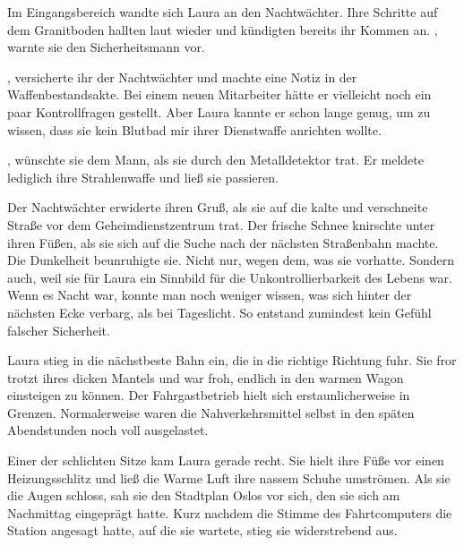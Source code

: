 Im Eingangsbereich wandte sich Laura an den Nachtwächter. Ihre Schritte auf dem Granitboden hallten laut wieder und kündigten bereits ihr Kommen an. , warnte sie den Sicherheitsmann vor. 

\par

, versicherte ihr der Nachtwächter und machte eine Notiz in der Waffenbestandsakte. Bei einem neuen Mitarbeiter hätte er vielleicht noch ein paar Kontrollfragen gestellt. Aber Laura kannte er schon lange genug, um zu wissen, dass sie kein Blutbad mir ihrer Dienstwaffe anrichten wollte.

\par

, wünschte sie dem Mann, als sie durch den Metalldetektor trat. Er meldete lediglich ihre Strahlenwaffe und ließ sie passieren.

\par

Der Nachtwächter erwiderte ihren Gruß, als sie auf die kalte und verschneite Straße vor dem Geheimdienstzentrum trat. Der frische Schnee knirschte unter ihren Füßen, als sie sich auf die Suche nach der nächsten Straßenbahn machte. Die Dunkelheit beunruhigte sie. Nicht nur, wegen dem, was sie vorhatte. Sondern auch, weil sie für Laura ein Sinnbild für die Unkontrollierbarkeit des Lebens war. Wenn es Nacht war, konnte man noch weniger wissen, was sich hinter der nächsten Ecke verbarg, als bei Tageslicht. So entstand zumindest kein Gefühl falscher Sicherheit.

\par

Laura stieg in die nächstbeste Bahn ein, die in die richtige Richtung fuhr. Sie fror trotzt ihres dicken Mantels und war froh, endlich in den warmen Wagon einsteigen zu können. Der Fahrgastbetrieb hielt sich erstaunlicherweise in Grenzen. Normalerweise waren die Nahverkehrsmittel selbst in den späten Abendstunden noch voll ausgelastet.

\par

Einer der schlichten Sitze kam Laura gerade recht. Sie hielt ihre Füße vor einen Heizungsschlitz und ließ die Warme Luft ihre nassem Schuhe umströmen. Als sie die Augen schloss, sah sie den Stadtplan Oslos vor sich, den sie sich am Nachmittag eingeprägt hatte. Kurz nachdem die Stimme des Fahrtcomputers die Station angesagt hatte, auf die sie wartete, stieg sie widerstrebend aus.

